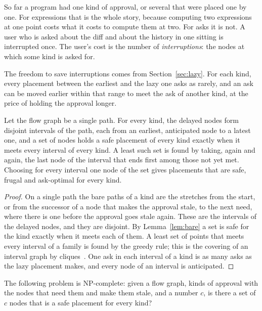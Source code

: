 \documentclass[acmsmall,nonacm,screen]{acmart}
\begin{document}
So far a program had one kind of approval, or several that were placed one by one. For
expressions that is the whole story, because computing two expressions at one point costs
what it costs to compute them at two. For asks it is not. A user who is asked about the
diff and about the history in one sitting is interrupted once. The user's cost is the
number of \emph{interruptions}: the nodes at which some kind is asked for.

The freedom to save interruptions comes from Section~\ref{sec:lazy}. For each kind, every
placement between the earliest and the lazy one asks as rarely, and an ask can be moved
earlier within that range to meet the ask of another kind, at the price of holding the
approval longer.

\begin{theorem}
\label{thm:line}
Let the flow graph be a single path. For every kind, the delayed nodes form disjoint
intervals of the path, each from an earliest, anticipated node to a latest one, and a set of
nodes holds a safe placement of every kind exactly when it meets every interval of every
kind. A least such set is found by taking, again and again, the last node of the interval
that ends first among those not yet met. Choosing for every interval one node of the set
gives placements that are safe, frugal and ask-optimal for every kind.
\end{theorem}

\begin{proof}
On a single path the bare paths of a kind are the stretches from the start, or from the
successor of a node that makes the approval stale, to the next need, where there is one
before the approval goes stale again. These are the intervals of the delayed nodes, and
they are disjoint. By Lemma~\ref{lem:bare} a set is safe for the kind exactly when it meets
each of them. A least set of points that meets every interval of a family is found by the
greedy rule; this is the covering of an interval graph by cliques~\cite{gavril1972}. One ask
in each interval of a kind is as many asks as the lazy placement makes, and every node of
an interval is anticipated.
\end{proof}

\begin{theorem}
\label{thm:hard}
The following problem is NP-complete: given a flow graph, kinds of approval with the nodes
that need them and make them stale, and a number $c$, is there a set of $c$ nodes that is a
safe placement for every kind?
\end{theorem}
\end{document}
